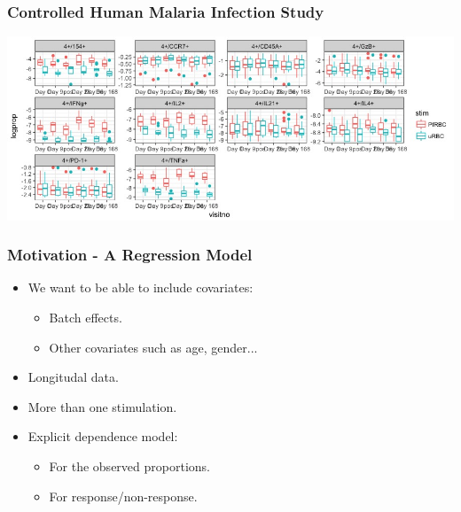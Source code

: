 \documentclass{beamer}
\theoremstyle{definition}
\begin{document}

\begin{frame}
\frametitle{Controlled Human Malaria Infection Study}
\begin{center}
\includegraphics[scale=0.38]{figures/malariaBoxplotsFourPlus}
\end{center}
\end{frame}


\begin{frame}
\frametitle{Motivation - A Regression Model}
\begin{itemize}
\item We want to be able to include covariates:
	\begin{itemize}
	\item Batch effects.
	\item Other covariates such as age, gender...
	\end{itemize}

\pause
\vspace{0.7 cm}
\item Longitudal data.

\vspace{0.7 cm}
\item More than one stimulation.

\pause
\vspace{0.7 cm}
\item Explicit dependence model:
	\begin{itemize}
	\item For the observed proportions.
	\item For response/non-response.
	\end{itemize}
\end{itemize}
\end{frame}

\end{document}
